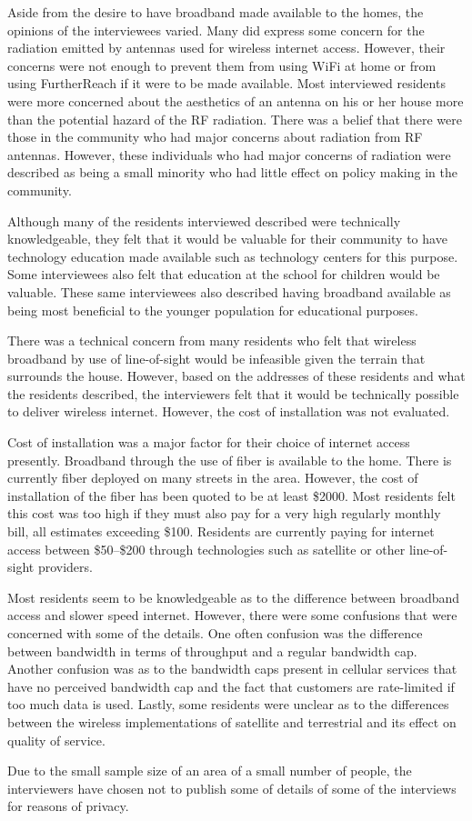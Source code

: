 Aside from the desire to have broadband made available to the homes, the opinions of the 
interviewees varied. Many did express some concern for the radiation emitted by antennas
used for wireless internet access. However, their concerns were not enough to prevent them
from using WiFi at home or from using FurtherReach if it were to be made available.
Most interviewed residents were more concerned about the aesthetics of an antenna on his or her
house more than the potential hazard of the RF radiation.
There was a belief that there were those in the community who had major concerns about radiation
from RF antennas. However, these individuals who had major concerns of radiation were described
as being a small minority who had little effect on policy making in the community.

Although many of the residents interviewed described were technically knowledgeable, they felt
that it would be valuable for their community to have technology education made available such
as technology centers for this purpose. Some interviewees also felt that education at the school
for children would be valuable. These same interviewees also described having broadband available
as being most beneficial to the younger population for educational purposes.

There was a technical concern from many residents who felt that wireless broadband by use of
line-of-sight would be infeasible given the terrain that surrounds the house. However, based
on the addresses of these residents and what the residents described, the interviewers felt
that it would be technically possible to deliver wireless internet. However, the cost of
installation was not evaluated.

Cost of installation was a major factor for their choice of internet access presently. Broadband
through the use of fiber is available to the home. There is currently fiber deployed on many
streets in the area. However, the cost of installation of the fiber has been quoted to be at least \$2000.
Most residents felt this cost was too high if they must also pay for a very high regularly monthly bill, all
estimates exceeding \$100. Residents are currently paying for internet access between \$50--\$200
through technologies such as satellite or other line-of-sight providers.

Most residents seem to be knowledgeable as to the difference between broadband access and slower speed internet.
However, there were some confusions that were concerned with some of the details. One often confusion was
the difference between bandwidth in terms of throughput and a regular bandwidth cap. Another confusion was
as to the bandwidth caps present in cellular services that have no perceived bandwidth cap and the fact that
customers are rate-limited if too much data is used. Lastly, some residents were unclear as to the differences
between the wireless implementations of satellite and terrestrial and its effect on quality of service.

Due to the small sample size of an area of a small number of people,
the interviewers have chosen not to publish some of details of some of the
interviews for reasons of privacy.



